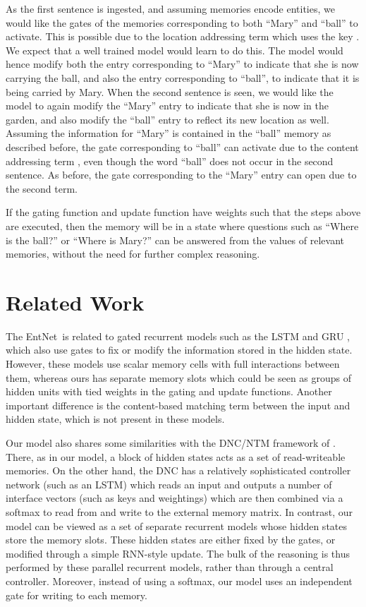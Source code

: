\documentclass{article} \usepackage{iclr2016_conference,times}
\newcommand{\modelabbrev}{EntNet}
\begin{document}
As the first sentence  is ingested, and assuming memories encode entities,
we would like the gates of the memories corresponding to both ``Mary'' and ``ball'' 
to activate. This is possible  due to the location addressing term  which uses the key
. We expect that a well trained model would learn to do this.
The model would hence modify both the entry corresponding to ``Mary'' to indicate that 
she is now carrying the ball, and also the entry corresponding to ``ball'', to indicate
that it is being carried by Mary. 
When the second sentence is seen, we would like the model to again modify the ``Mary''
entry to indicate that she is now in the garden,
and also modify the ``ball'' entry to reflect its new location as well. 
Assuming the information for ``Mary'' is contained in the ``ball'' memory as described before,
the gate corresponding to ``ball'' can activate due to the content addressing term ,
even though the word ``ball'' does not occur in the second sentence. 
As before, the gate corresponding to the ``Mary'' entry can open due to the second term.

If the gating function and update function have weights such that the steps above are executed,
then the memory will be in a state where questions such as
``Where is the ball?'' or ``Where is Mary?'' can be answered from the values of relevant memories,
without the need for further complex reasoning.



\section{Related Work} \label{sec:related}

The \modelabbrev~is related to gated recurrent models such as the LSTM \citep{LSTM} and GRU \citep{GRU}, which also use gates to fix or modify the information stored in the hidden state. However, these models use scalar memory cells with full interactions between them, whereas ours has separate memory slots which could be seen as groups of hidden units with tied weights in the gating and update functions.
Another important difference is the content-based matching term between the input and hidden state, which is not present in these models. 

Our model also shares some similarities with the DNC/NTM framework of \citep{NTM, graves2016hybrid}. There, as in our model, a block of hidden states acts as a set of read-writeable memories. On the other hand, the DNC has a relatively sophisticated controller network (such as an LSTM) which reads an input and outputs a number of interface vectors (such as keys and weightings) which are then combined via a softmax to read from and write to the external memory matrix. 
In contrast, our model can be viewed as a set of separate recurrent models whose hidden states store the memory slots. These hidden states are either fixed by the gates, or modified through a simple RNN-style update. The bulk of the reasoning is thus performed by these parallel recurrent models, rather than through a central controller.  Moreover, instead of using a softmax, our model uses an independent gate for writing to each memory.  
\end{document}
